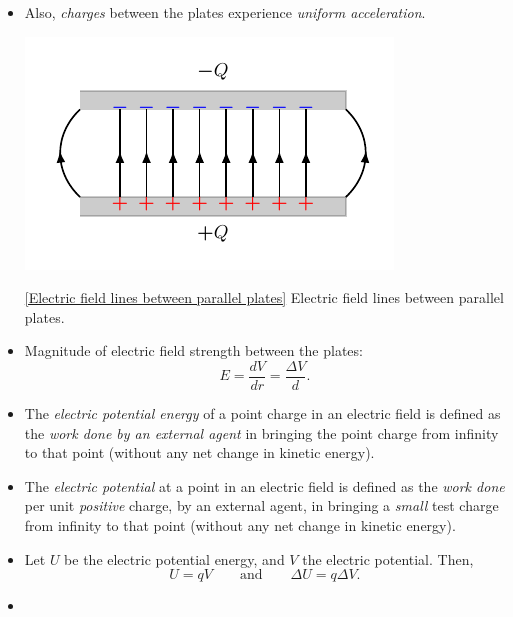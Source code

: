 \documentclass[oneside]{book}
\begin{document}
\begin{itemize}
  \item Also, \emph{charges} between the plates experience \emph{uniform acceleration}.
  \begin{center}
    \includegraphics[scale=1]{../images/ParallelPlates/testing.pdf}
    \captionsetup{type=figure}
    \caption[figure]{\ref{Electric field lines between parallel plates} Electric field lines between parallel plates.}
  \end{center}
  \item Magnitude of electric field strength between the plates:
  \[E=\frac{dV}{dr}=\frac{\Delta V}{d}.\]
  \item The \emph{electric potential energy} of a point charge in an electric field is defined as the \emph{work done by an external agent} in bringing the point charge from infinity to that point (without any net change in kinetic energy). 
  \item The \emph{electric potential} at a point in an electric field is defined as the \emph{work done} per unit \emph{positive} charge, by an external agent, in bringing a \emph{small} test charge from infinity to that point (without any net change in kinetic energy). 
  \item Let \(U\) be the electric potential energy, and \(V\) the electric potential. Then,
  \[U=qV \qquad\text{and}\qquad \Delta U=q\Delta V.\]
  \item ~
  \begin{center}

\end{center}
\end{itemize}
\end{document}
